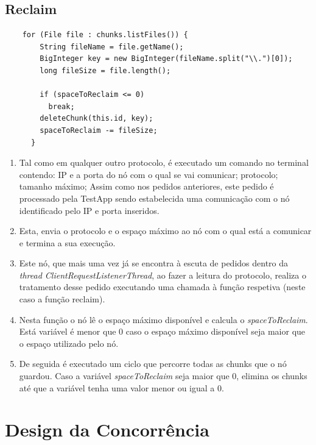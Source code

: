 \documentclass[11pt,oneside]{book}
\begin{document}
\subsection{Reclaim}
\begin{lstlisting}
    for (File file : chunks.listFiles()) {
        String fileName = file.getName();
        BigInteger key = new BigInteger(fileName.split("\\.")[0]);
        long fileSize = file.length();
   
        if (spaceToReclaim <= 0)
          break;
        deleteChunk(this.id, key);
        spaceToReclaim -= fileSize;
      }
\end{lstlisting}

\begin{enumerate}   
    
    \item Tal como em qualquer outro protocolo, é executado um comando no terminal 
    contendo: IP e a porta do nó com o qual se vai comunicar; protocolo; tamanho máximo;  
    Assim como nos pedidos anteriores, este pedido é processado pela TestApp sendo estabelecida
    uma comunicação com o nó identificado pelo IP e porta inseridos.

    \item Esta, envia o protocolo e o espaço máximo ao nó com o qual está a comunicar e termina 
    a sua execução.

    \item Este nó, que mais uma vez já se encontra à escuta de pedidos dentro da
    \textit{thread ClientRequestListenerThread}, ao fazer a leitura do protocolo, realiza o 
    tratamento desse pedido executando uma chamada à função respetiva (neste caso a função 
    reclaim).
     
    \item Nesta função o nó lê o espaço máximo disponível e calcula o \textit{spaceToReclaim}. 
    Está variável é menor que 0 caso o espaço máximo disponível seja maior que o espaço utilizado
    pelo nó.

    \item De seguida é executado um ciclo que percorre todas as chunks que o nó guardou. Caso a 
    variável \textit{spaceToReclaim} seja maior que 0, elimina os chunks até que a variável 
    tenha uma valor menor ou igual a 0.
\end{enumerate}

 
\pagebreak

\section{Design da Concorrência}
\end{document}
